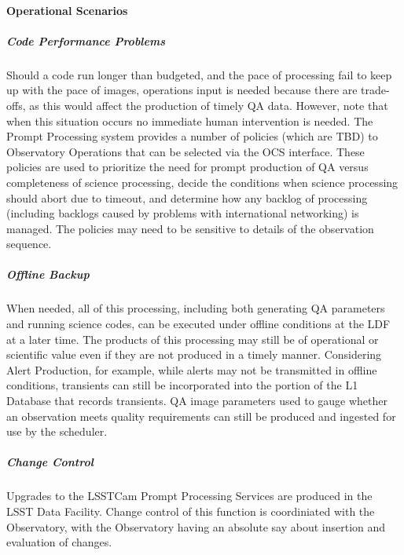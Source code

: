\paragraph{Operational Scenarios}

\subparagraph{Code Performance Problems}
Should a code run longer than budgeted, and the pace of processing
fail to keep up with the pace of images, operations input is needed
because there are trade-offs, as this would affect the production of
timely QA data.  However, note that when this situation occurs no
immediate human intervention is needed.  The Prompt Processing system
provides a number of policies (which are TBD) to Observatory
Operations that can be selected via the OCS interface.  These policies
are used to prioritize the need for prompt production of QA versus
completeness of science processing, decide the conditions when science
processing should abort due to timeout, and determine how any backlog
of processing (including backlogs caused by problems with
international networking) is managed.  The policies may need to be
sensitive to details of the observation sequence.

\subparagraph{Offline Backup}
When needed, all of this processing, including both generating QA
parameters and running science codes, can be executed under offline
conditions at the LDF at a later time.  The products of
this processing may still be of operational or scientific value even
if they are not produced in a timely manner.  Considering Alert
Production, for example, while alerts may not be transmitted in
offline conditions, transients can still be incorporated into the
portion of the L1 Database that records transients.  QA image
parameters used to gauge whether an observation meets quality
requirements can still be produced and ingested for use by the scheduler.

\subparagraph{Change Control}
Upgrades to the LSSTCam Prompt Processing Services are produced in the LSST Data Facility. Change control
of this function is coordiniated with the Observatory, with the Observatory having an absolute say
about insertion and evaluation of changes.
